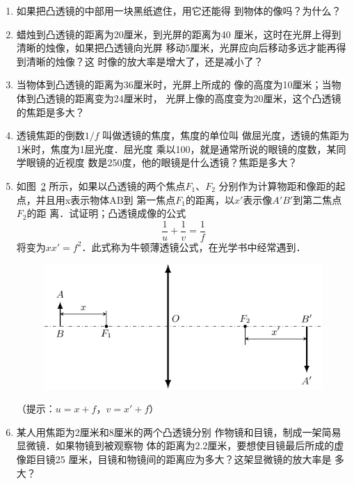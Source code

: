 \begin{enumerate}
\begin{figure}[htbp]
    \caption{}\label{fig_C_5-59}
\end{figure}
\item 如果把凸透镜的中部用一块黑纸遮住，用它还能得
到物体的像吗？为什么？
\item 蜡烛到凸透镜的距离为20厘米，到光屏的距离为40
厘米，这时在光屏上得到清晰的烛像，如果把凸透镜向光屏
移动5厘米，光屏应向后移动多远才能再得到清晰的烛像？这
时像的放大率是增大了，还是减小了？
\item 当物体到凸透镜的距离为36厘米时，光屏上所成的
像的高度为10厘米；当物体到凸透镜的距离变为24厘米时，
光屏上像的高度变为20厘米，这个凸透镜的焦距是多大？
\item 透镜焦距的倒数$1/f$
叫做透镜的焦度，焦度的单位叫
做屈光度，透镜的焦距为1米时，焦度为1屈光度．屈光度
乘以100，就是通常所说的眼镜的度数，某同学眼镜的近视度
数是250度，他的眼镜是什么透镜？焦距是多大？
\item 如图~\ref{fig_C_5-60} 所示，如果以凸透镜的两个焦点$F_1$、$F_2$
分别作为计算物距和像距的起点，并且用x表示物体AB到
第一焦点$F_1$的距离，以$x'$表示像$A'B'$到第二焦点$F_2$的距
离．试证明；凸透镜成像的公式
\[\frac{1}{u}+\frac{1}{v}=\frac{1}{f} \]
将变为$xx'=f^2$．此式称为牛顿薄透镜公式，在光学书中经常遇到．
\begin{figure}[htbp]
    \centering
    \includegraphics{fig/C/5-60.pdf}
    \caption{}\label{fig_C_5-60}
\end{figure}
（提示：$u=x+f$，$v=x'+f$）
\item 某人用焦距为2厘米和8厘米的两个凸透镜分别
作物镜和目镜，制成一架简易显微镜．如果物镜到被观察物
体的距离为2.2厘米，要想使目镜最后所成的虚像距目镜25
厘米，目镜和物镜间的距离应为多大？这架显微镜的放大率是
多大？
\end{enumerate}


